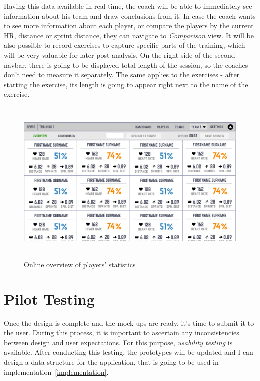Having this data available in real-time, the coach will be able to immediately see information about his team and draw conclusions from it. In case the coach wants to see more information about each player, or compare the players by the current HR, distance or sprint distance, they can navigate to \textit{Comparison} view. It will be also possible to record exercises to capture specific parts of the training, which will be very valuable for later post-analysis. On the right side of the second navbar, there is going to be displayed total length of the session, so the coaches don’t need to measure it separately. The same applies to the exercises - after starting the exercise, its length is going to appear right next to the name of the exercise.

\begin{figure}[htb]
\begin{center}
  \includegraphics*[width=14cm,height=8cm,keepaspectratio]{images/online_before}
\end{center}
\caption{Online overview of players’ statistics}
\label{img:online_before}
\end{figure}



\chapter{Pilot Testing}\label{pilot-testing}
Once the design is complete and the mock-ups are ready, it’s time to submit it to the user. During this process, it is important to ascertain any inconsistencies between design and user expectations. For this purpose, \textit{usability testing} is available. After conducting this testing, the prototypes will be updated and I can design a data structure for the application, that is going to be used in implementation~\ref{implementation}.

